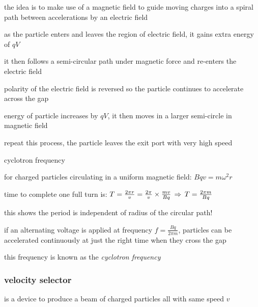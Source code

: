 the idea is to make use of a magnetic field to guide moving charges into a spiral path between accelerations by an electric field

as the particle enters and leaves the region of electric field, it gains extra energy of $qV$

it then follows a semi-circular path under magnetic force and re-enters the electric field

polarity of the electric field is reversed so the particle continues to accelerate across the gap

energy of particle increases by $qV$, it then moves in a larger semi-circle in magnetic field

repeat this process, the particle leaves the exit port with very high speed



\cmt cyclotron frequency

for charged particles circulating in a uniform magnetic field: $Bqv=m\omega^2 r$

time to complete one full turn is: $T=\frac{2\pi r}{v} = \frac{2\pi}{v}\times\frac{mv}{Bq}\, \Rightarrow \, T=\frac{2\pi m}{Bq}$

this shows the period is independent of radius of the circular path!

if an alternating voltage is applied at frequency $f=\frac{Bq}{2\pi m}$, particles can be accelerated continuously at just the right time when they cross the gap

this frequency is known as the \emph{cyclotron frequency}



\subsubsection{velocity selector}

 is a device to produce a beam of charged particles all with same speed $v$


